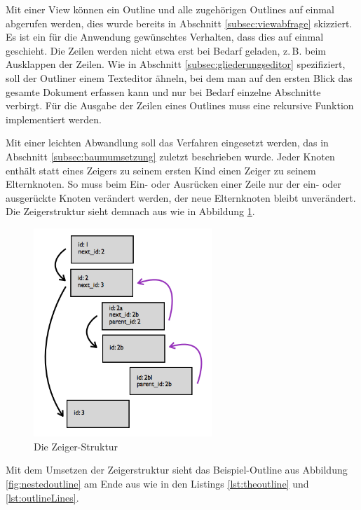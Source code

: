 Mit einer View können ein Outline und alle zugehörigen Outlines auf einmal abgerufen werden, dies wurde bereits in Abschnitt \ref{subsec:viewabfrage} skizziert. Es ist ein für die Anwendung gewünschtes Verhalten, dass dies auf einmal geschieht. Die Zeilen werden nicht etwa erst bei Bedarf geladen, z.\,B. beim Ausklappen der Zeilen. Wie in Abschnitt \ref{subsec:gliederungseditor} spezifiziert, soll der Outliner einem Texteditor ähneln, bei dem man auf den ersten Blick das gesamte Dokument erfassen kann und nur bei Bedarf einzelne Abschnitte verbirgt. Für die Ausgabe der Zeilen eines Outlines muss eine rekursive Funktion implementiert werden.

Mit einer leichten Abwandlung soll das Verfahren eingesetzt werden, das in Abschnitt \ref{subsec:baumumsetzung} zuletzt beschrieben wurde. Jeder Knoten enthält statt eines Zeigers zu seinem ersten Kind einen Zeiger zu seinem Elternknoten. So muss beim Ein- oder Ausrücken einer Zeile nur der ein- oder ausgerückte Knoten verändert werden, der neue Elternknoten bleibt unverändert. Die Zeigerstruktur sieht demnach aus wie in Abbildung \ref{fig:pointer}. 

\medskip
\begin{figure}[H] 
  \begin{center}
    \includegraphics[width=0.6\textwidth]{grafik/pointer} 
  \end{center}
  \caption{Die Zeiger-Struktur}
  \label{fig:pointer}
\end{figure}


Mit dem Umsetzen der Zeigerstruktur sieht das Beispiel-Outline aus Abbildung \ref{fig:nestedoutline} am Ende aus wie in den Listings \ref{lst:theoutline} und \ref{lst:outlineLines}. 

